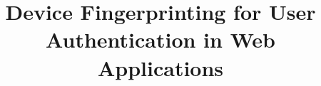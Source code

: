 \documentclass{acm_proc_article-sp}
\begin{document}
\title{Device Fingerprinting for User Authentication in Web Applications}


%
%
%
%
%
\end{document}
